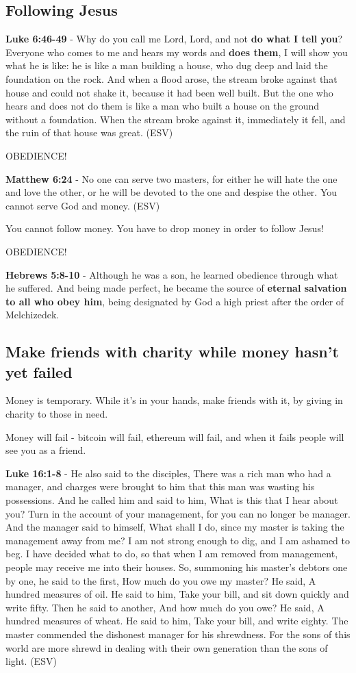 \documentclass[11pt]{article}
\begin{document}
\subsection{Following Jesus}
\label{sec:orgeab9ae5}
\textbf{Luke 6:46-49} - Why do you call me Lord, Lord, and not \textbf{do what I tell you}? Everyone who comes to me and hears my words and \textbf{does them}, I will show you what he is like: he is like a man building a house, who dug deep and laid the foundation on the rock. And when a flood arose, the stream broke against that house and could not shake it, because it had been well built. But the one who hears and does not do them is like a man who built a house on the ground without a foundation. When the stream broke against it, immediately it fell, and the ruin of that house was great. (ESV)

OBEDIENCE!

\textbf{Matthew 6:24} - No one can serve two masters, for either he will hate the one and love the other, or he will be devoted to the one and despise the other. You cannot serve God and money. (ESV)

You cannot follow money. You have to drop money in order to follow Jesus!

OBEDIENCE!

\textbf{Hebrews 5:8-10} - Although he was a son, he learned obedience through what he suffered. And being made perfect, he became the source of \textbf{eternal salvation to all who obey him}, being designated by God a high priest after the order of Melchizedek.

\subsection{Make friends with charity while money hasn't yet failed}
\label{sec:orge60056a}
Money is temporary. While it's in your hands, make friends with it, by giving in charity to those in need.

Money will fail - bitcoin will fail, ethereum will fail, and when it fails people will see you as a friend.

\textbf{Luke 16:1-8} - He also said to the disciples, There was a rich man who had a manager, and charges were brought to him that this man was wasting his possessions. And he called him and said to him, What is this that I hear about you? Turn in the account of your management, for you can no longer be manager. And the manager said to himself, What shall I do, since my master is taking the management away from me? I am not strong enough to dig, and I am ashamed to beg. I have decided what to do, so that when I am removed from management, people may receive me into their houses. So, summoning his master's debtors one by one, he said to the first, How much do you owe my master? He said, A hundred measures of oil. He said to him, Take your bill, and sit down quickly and write fifty. Then he said to another, And how much do you owe? He said, A hundred measures of wheat. He said to him, Take your bill, and write eighty. The master commended the dishonest manager for his shrewdness. For the sons of this world are more shrewd in dealing with their own generation than the sons of light. (ESV)
\end{document}
